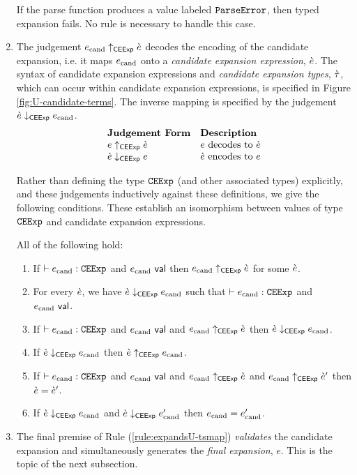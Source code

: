 \begin{enumerate}
If the parse function produces a value labeled $\mathtt{ParseError}$, then typed expansion fails. No rule is necessary to handle this case. 

\item The judgement $e_\text{cand} \uparrow_\mathsf{CEExp} \grave{e}$ decodes the encoding of the candidate expansion, i.e. it maps $e_\text{cand}$ onto a \emph{candidate expansion expression}, $\grave{e}$. The syntax of candidate expansion expressions and \emph{candidate expansion types}, $\grave{\tau}$, which can occur within candidate expansion expressions, is specified in Figure \ref{fig:U-candidate-terms}. The inverse mapping is specified by the judgement $\grave{e} \downarrow_\mathsf{CEExp} e_\text{cand}$. 
\[\begin{array}{ll}
\textbf{Judgement Form} & \textbf{Description}\\
e \uparrow_\mathsf{CEExp} \grave{e} & \text{$e$ decodes to $\grave{e}$}\\
\grave{e} \downarrow_\mathsf{CEExp} e & \text{$\grave{e}$ encodes to $e$}
\end{array}\]

Rather than defining the type $\mathtt{CEExp}$ (and other associated types) explicitly, and these judgements inductively against these definitions, we give  the following conditions. These establish an isomorphism between values of type $\mathtt{CEExp}$ and candidate expansion expressions.

\begin{condition} All of the following hold:
\begin{enumerate}
\item If $\vdash e_\text{cand} : \mathtt{CEExp}$ and $e_\text{cand}~\mathsf{val}$ then $e_\text{cand} \uparrow_\mathsf{CEExp} \grave{e}$ for some $\grave{e}$.
\item For every $\grave{e}$, we have $\grave{e} \downarrow_\mathsf{CEExp} e_\text{cand}$ such that $\vdash e_\text{cand} : \mathtt{CEExp}$ and $e_\text{cand}~\mathsf{val}$.
\item If $\vdash e_\text{cand} : \mathtt{CEExp}$ and $e_\text{cand}~\mathsf{val}$ and $e_\text{cand} \uparrow_\mathsf{CEExp} \grave{e}$ then $\grave{e} \downarrow_\mathsf{CEExp} e_\text{cand}$.
\item If $\grave{e} \downarrow_\mathsf{CEExp} e_\text{cand}$ then $\grave{e} \uparrow_\mathsf{CEExp} e_\text{cand}$.
\item If $\vdash e_\text{cand} : \mathtt{CEExp}$ and $e_\text{cand}~\mathsf{val}$ and $e_\text{cand} \uparrow_\mathsf{CEExp} \grave{e}$ and $e_\text{cand} \uparrow_\mathsf{CEExp} \grave{e}'$ then $\grave{e}=\grave{e}'$.
\item If $\grave{e} \downarrow_\mathsf{CEExp} e_\text{cand}$ and $\grave{e} \downarrow_\mathsf{CEExp} e_\text{cand}'$ then $e_\text{cand}=e_\text{cand}'$.
\end{enumerate}
\end{condition}

\item The final premise of Rule (\ref{rule:expandsU-tsmap}) \emph{validates} the candidate expansion and simultaneously generates the \emph{final expansion}, $e$. This is the topic of the next subsection.
\end{enumerate}

